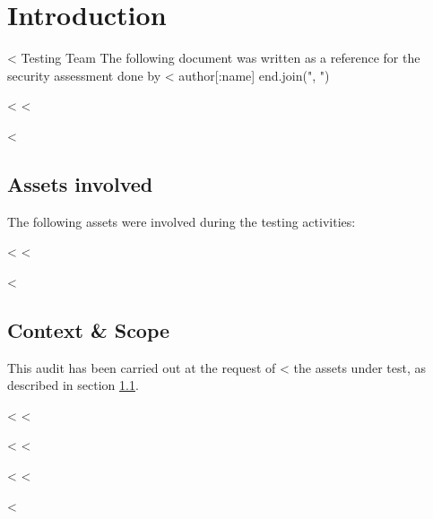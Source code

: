 

\chapter{Introduction}\label{cha:introduction}

  <%
         Testing Team %
  The following document was written as a reference for the security
  assessment done by <%
    author[:name]
  end.join(", ") %

  <%
  <%

  <%
  \section{Assets involved}\label{sec:assets}

    The following assets were involved during the testing activities:

    \begin{itemize}
      <%
        <%
          \item \textbf{<%
        <%
          \item \textbf{<%
        <%
      <%
    \end{itemize}

  <%
  <%

  <%
  \section{Context \& Scope}\label{sec:scope}

    This audit has been carried out at the request of
    <%
    the assets under test, as described in section \ref{sec:assets}.

  <%
  <%

  <%
  <%

  <%
  <%


<%
